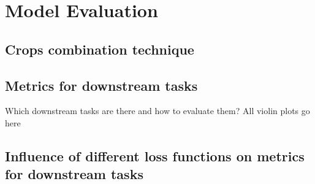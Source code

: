 \section{Model Evaluation}
    \subsection{Crops combination technique}
        
    \subsection{Metrics for downstream tasks}
        Which downstream tasks are there and how to evaluate them? All violin plots go here
    \subsection{Influence of different loss functions on metrics for downstream tasks}
